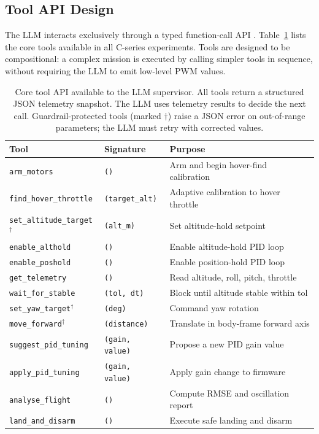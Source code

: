 \subsection{Tool API Design}
\label{sec:ch3_proposed_tools}

The LLM interacts exclusively through a typed function-call API
\cite{vemprala2023chatgpt}. Table~\ref{tab:ch3_tools} lists the core tools
available in all C-series experiments. Tools are designed to be compositional:
a complex mission is executed by calling simpler tools in sequence, without
requiring the LLM to emit low-level PWM values.

\begin{table}[ht]
  \caption{Core tool API available to the LLM supervisor. All tools return a
    structured JSON telemetry snapshot. The LLM uses telemetry results to
    decide the next call. Guardrail-protected tools (marked $\dagger$) raise
    a JSON error on out-of-range parameters; the LLM must retry with corrected
    values.}
  \label{tab:ch3_tools}
  \centering
  \small
  \begin{tabular}{lll}
    \toprule
    Tool & Signature & Purpose \\
    \midrule
    \texttt{arm\_motors}            & \texttt{()} & Arm and begin hover-find calibration \\
    \texttt{find\_hover\_throttle}  & \texttt{(target\_alt)} & Adaptive calibration to hover throttle \\
    \texttt{set\_altitude\_target}$^\dagger$ & \texttt{(alt\_m)} & Set altitude-hold setpoint \\
    \texttt{enable\_althold}        & \texttt{()} & Enable altitude-hold PID loop \\
    \texttt{enable\_poshold}        & \texttt{()} & Enable position-hold PID loop \\
    \texttt{get\_telemetry}         & \texttt{()} & Read altitude, roll, pitch, throttle \\
    \texttt{wait\_for\_stable}      & \texttt{(tol, dt)} & Block until altitude stable within tol \\
    \texttt{set\_yaw\_target}$^\dagger$ & \texttt{(deg)} & Command yaw rotation \\
    \texttt{move\_forward}$^\dagger$ & \texttt{(distance)} & Translate in body-frame forward axis \\
    \texttt{suggest\_pid\_tuning}   & \texttt{(gain, value)} & Propose a new PID gain value \\
    \texttt{apply\_pid\_tuning}     & \texttt{(gain, value)} & Apply gain change to firmware \\
    \texttt{analyse\_flight}        & \texttt{()} & Compute RMSE and oscillation report \\
    \texttt{land\_and\_disarm}      & \texttt{()} & Execute safe landing and disarm \\
    \bottomrule
  \end{tabular}
\end{table}

